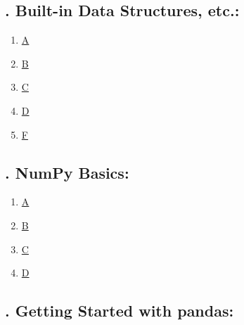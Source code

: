 \documentclass[11pt]{article}
\begin{document}
\subsection*{\small {}. Built-in Data Structures, etc.:}

\vspace{-0.5cm}

\begin{multicols}{6}
	\begin{enumerate}
		\item \href{https://mp.weixin.qq.com/s/Ytw07RHhIaQ064BxV8upcA}{A}	%
		\item \href{https://mp.weixin.qq.com/s/ZG97yALM1AAdK3ezqqRkcQ}{B}	%
		\item \href{https://mp.weixin.qq.com/s/5-sdWdhLQrcrzDtrPnNCiw}{C}	%
		\item \href{https://mp.weixin.qq.com/s/Sna8hOge17fM0d3R7EZwbg}{D}	%
		\item \href{https://mp.weixin.qq.com/s/Egi6khNPmPpD0rimOtR-Ew}{F}	%
	\end{enumerate}
\end{multicols}

\subsection*{\small {}. NumPy Basics:}

\vspace{-0.5cm}

\begin{multicols}{6}
	\begin{enumerate}
		\item \href{https://mp.weixin.qq.com/s/qv1rSBUl9Y4qttO_hR_Zjg}{A}	%
		\item \href{https://mp.weixin.qq.com/s/cw-eRHc5vZMNpeG0euSF0Q}{B}	%
		\item \href{https://mp.weixin.qq.com/s/Xhx1T8PZnEEslPRe65GysA}{C}	%
		\item \href{https://mp.weixin.qq.com/s/I49KLYqF-j99Tt-aUZVUPw}{D}	%
	\end{enumerate}
\end{multicols}

\subsection*{\small {}. Getting Started with pandas:}

\vspace{-0.5cm}
\end{document}
